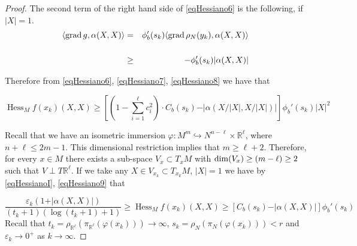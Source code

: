 \documentclass[a4paper]{amsart}
\begin{document}
\begin{proof}
The second term of the right hand side of \eqref{eqHessiano6} is the following, if $\vert X\vert =1$.
\begin{eqnarray} \langle {{{\rm{grad}\,}}} g, \alpha (X,X)\rangle & = & \phi_{b}'(s_k)\langle {{{\rm{grad}\,}}} \rho_{N}(y_k), \alpha (X,X)\rangle\nonumber\\ 
&& \label{eqHessiano8}\\
&\geq & -\phi_{b}'(s_k)\vert \alpha(X,X) \vert\nonumber
\end{eqnarray}

Therefore from \eqref{eqHessiano6}, \eqref{eqHessiano7}, \eqref{eqHessiano8} we have that

\begin{equation}\operatorname{Hess}_{M}f(x_{k})(X,X) \geq \left[(1- \sum_{i=1}^{\ell}\!c_i^{2})\cdot  C_{b}(s_k) -  \vert \alpha (X/\vert X\vert,X/\vert X\vert) \vert\right]\phi_{b}'(s_k)\vert X\vert^{2}\label{eqHessiano9}\end{equation}

Recall that we have an isometric immersion $\varphi \colon M^{m}\hookrightarrow N^{n-\ell}\times \mathbb{R}^{\ell}$, where $n+\ell\leq 2m-1$. This dimensional restriction implies that $m\geq \ell + 2$. Therefore, for every $x\in M$ there exists a  sub-space $V_x\subset T_xM$ with ${\rm dim}(V_x)\geq (m-\ell)\geq  2$ such that $V\perp T\mathbb{R}^{\ell}$. If we take any $X\in V_{x_k}\subset T_{x_k}M$, $\vert X\vert=1$ we have by \eqref{eqHessianoI}, \eqref{eqHessiano9} that

\begin{equation}\frac{\varepsilon_{k}(1+ \vert \alpha(X,X)\vert  )}{(t_k+1)(\log (t_k+1)+1)}\geq \operatorname{Hess}_{M}f(x_{k})(X,X) \geq \left[  C_{b}(s_k) -  \vert \alpha (X,X) \vert\right]\phi_{b}'(s_k)\label{eqHessiano10}\end{equation} Recall that $t_k = \rho_{\mathbb{R}^{\ell}}(\pi_{\mathbb{R}^{\ell}}(\varphi (x_{k})))\to \infty$, $s_{k}=\rho_{N}(\pi_{N}(\varphi (x_k)))<r$ and $\varepsilon_k\to 0^+$ as $k\to \infty$.


\end{proof}
\end{document}
